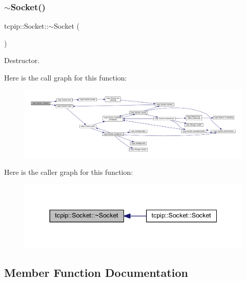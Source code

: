\subsubsection{\texorpdfstring{$\sim$\+Socket()}{~Socket()}}
{\footnotesize\ttfamily tcpip\+::\+Socket\+::$\sim$\+Socket (\begin{DoxyParamCaption}{ }\end{DoxyParamCaption})}



Destructor. 

Here is the call graph for this function\+:
\nopagebreak
\begin{figure}[H]
\begin{center}
\leavevmode
\includegraphics[width=350pt]{classtcpip_1_1_socket_a610c213f4b2fad07cc0bfddc3a5577e4_cgraph}
\end{center}
\end{figure}
Here is the caller graph for this function\+:
\nopagebreak
\begin{figure}[H]
\begin{center}
\leavevmode
\includegraphics[width=344pt]{classtcpip_1_1_socket_a610c213f4b2fad07cc0bfddc3a5577e4_icgraph}
\end{center}
\end{figure}


\subsection{Member Function Documentation}
\mbox{\label{classtcpip_1_1_socket_a7847299f806a73798f4ceb95ab0e3d51}} 
